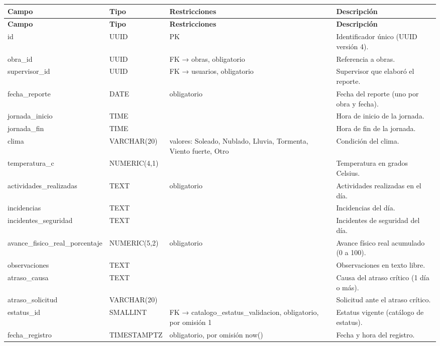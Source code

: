 \begin{xltabular}{\linewidth}{@{}>{\ttfamily\footnotesize}p{4.9cm}>{\ttfamily\footnotesize}p{2.4cm}>{\raggedright\arraybackslash\footnotesize}p{3.3cm}>{\footnotesize}X@{}}
\toprule\normalfont\sffamily\bfseries\footnotesize Campo & \normalfont\sffamily\bfseries\footnotesize Tipo & \sffamily\bfseries Restricciones & \sffamily\bfseries Descripción\\\midrule\endfirsthead
\toprule\normalfont\sffamily\bfseries\footnotesize Campo & \normalfont\sffamily\bfseries\footnotesize Tipo & \sffamily\bfseries Restricciones & \sffamily\bfseries Descripción\\\midrule\endhead
\bottomrule\endfoot
id & UUID & PK & Identificador único (UUID versión 4).\\
obra\_id & UUID & FK → obras, obligatorio & Referencia a obras.\\
supervisor\_id & UUID & FK → usuarios, obligatorio & Supervisor que elaboró el reporte.\\
fecha\_reporte & DATE & obligatorio & Fecha del reporte (uno por obra y fecha).\\
jornada\_inicio & TIME &  & Hora de inicio de la jornada.\\
jornada\_fin & TIME &  & Hora de fin de la jornada.\\
clima & VARCHAR(20) & valores: Soleado, Nublado, Lluvia, Tormenta, Viento fuerte, Otro & Condición del clima.\\
temperatura\_c & NUMERIC(4,1) &  & Temperatura en grados Celsius.\\
actividades\_realizadas & TEXT & obligatorio & Actividades realizadas en el día.\\
incidencias & TEXT &  & Incidencias del día.\\
incidentes\_seguridad & TEXT &  & Incidentes de seguridad del día.\\
avance\_fisico\_real\_porcentaje & NUMERIC(5,2) & obligatorio & Avance físico real acumulado (0 a 100).\\
observaciones & TEXT &  & Observaciones en texto libre.\\
atraso\_causa & TEXT &  & Causa del atraso crítico (1 día o más).\\
atraso\_solicitud & VARCHAR(20) &  & Solicitud ante el atraso crítico.\\
estatus\_id & SMALLINT & FK → catalogo\_estatus\_validacion, obligatorio, por omisión 1 & Estatus vigente (catálogo de estatus).\\
fecha\_registro & TIMESTAMPTZ & obligatorio, por omisión now() & Fecha y hora del registro.\\
\end{xltabular}

